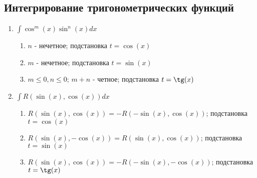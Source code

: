 \documentclass[a4paper,12pt]{scrartcl}
\begin{document}
\subsection{Интегрирование тригонометрических функций}
\begin{enumerate}
\item $\int\cos^m(x)\sin^n(x)dx$
\begin{enumerate}
\item $n$ - нечетное; подстановка $t = \cos(x) $
\item $m$ - нечетное; подстановка $t = \sin(x) $
\item $m \leqslant 0,n \leqslant0 $; $m+n$ - четное; подстановка $t = \tg(x)$
\end{enumerate}
\item $ \int R(\sin(x),\cos(x))dx$
\begin{enumerate}
\item $R(\sin(x),\cos(x)) = -R(-\sin(x),\cos(x))$; подстановка $t=\cos(x)$
\item $R(\sin(x),-\cos(x)) = R(\sin(x),\cos(x))$; подстановка $t=\sin(x)$
\item $R(\sin(x),\cos(x)) = -R(-\sin(x),-\cos(x))$; подстановка $t=\tg(x)$
\end{enumerate}
\end{enumerate}
\end{document}
